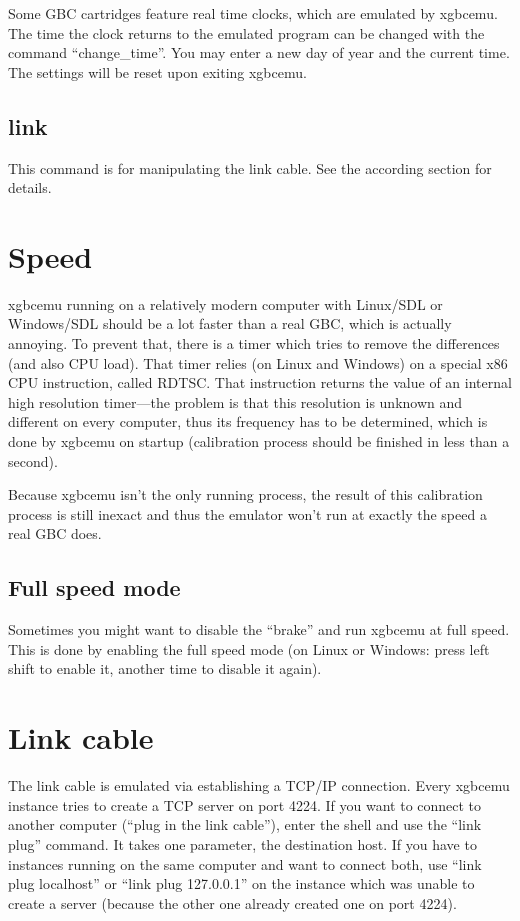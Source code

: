 \documentclass[fleqn,english,openany]{scrbook}
\begin{document}
Some GBC cartridges feature real time clocks, which are emulated by xgbcemu. The time the clock returns to the emulated
program can be changed with the command “change\_time”. You may enter a new day of year and the current time. The
settings will be reset upon exiting xgbcemu.

\subsection{link}

This command is for manipulating the link cable. See the according section for details.


\section{Speed}

xgbcemu running on a relatively modern computer with Linux/SDL or Windows/SDL should be a lot faster than a real GBC,
which is actually annoying. To prevent that, there is a timer which tries to remove the differences (and also CPU load).
That timer relies (on Linux and Windows) on a special x86 CPU instruction, called RDTSC. That instruction returns the
value of an internal high resolution timer---the problem is that this resolution is unknown and different on every
computer, thus its frequency has to be determined, which is done by xgbcemu on startup (calibration process should be
finished in less than a second).

Because xgbcemu isn't the only running process, the result of this calibration process is still inexact and thus the
emulator won't run at exactly the speed a real GBC does.

\subsection{Full speed mode}

Sometimes you might want to disable the “brake” and run xgbcemu at full speed. This is done by enabling the full speed
mode (on Linux or Windows: press left shift to enable it, another time to disable it again).


\section{Link cable}

The link cable is emulated via establishing a TCP/IP connection. Every xgbcemu instance tries to create a TCP server on
port 4224. If you want to connect to another computer (“plug in the link cable”), enter the shell and use the “link plug”
command. It takes one parameter, the destination host. If you have to instances running on the same computer and want to
connect both, use “link plug localhost” or “link plug 127.0.0.1” on the instance which was unable to create a server
(because the other one already created one on port 4224).
\end{document}
